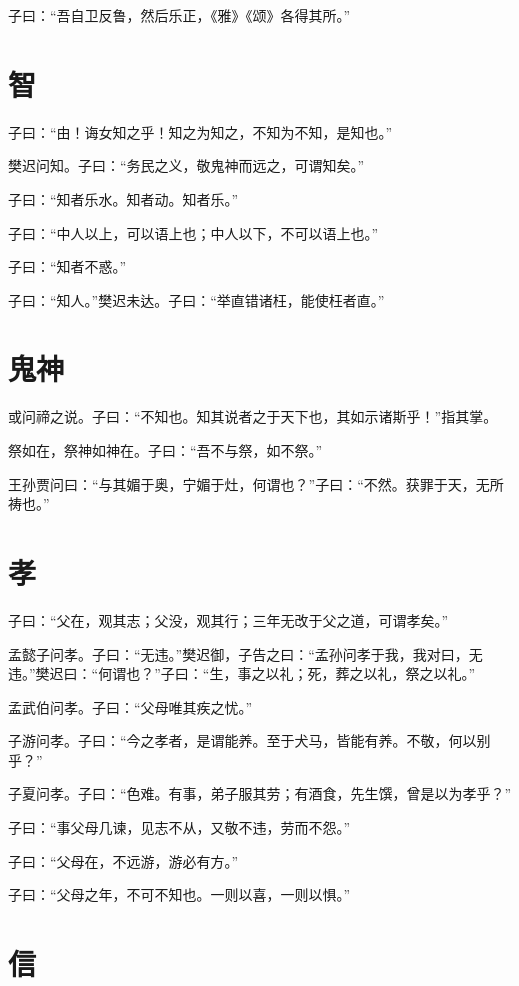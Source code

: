 \documentclass[a5paper]{ctexbook}
\begin{document}
    子曰：“吾自卫反鲁，然后乐正，《雅》《颂》各得其所。”

    \chapter{智}

    子曰：“由！诲女知之乎！知之为知之，不知为不知，是知也。”

    樊迟问知。子曰：“务民之义，敬鬼神而远之，可谓知矣。”
    
    子曰：“知者乐水。知者动。知者乐。”

    子曰：“中人以上，可以语上也；中人以下，不可以语上也。”

    子曰：“知者不惑。”

    子曰：“知人。”樊迟未达。子曰：“举直错诸枉，能使枉者直。”

    \chapter{鬼神}

    或问禘之说。子曰：“不知也。知其说者之于天下也，其如示诸斯乎！”指其掌。

    祭如在，祭神如神在。子曰：“吾不与祭，如不祭。”

    王孙贾问曰：“与其媚于奥，宁媚于灶，何谓也？”子曰：“不然。获罪于天，无所祷也。”

    \chapter{孝}

    子曰：“父在，观其志；父没，观其行；三年无改于父之道，可谓孝矣。”

    孟懿子问孝。子曰：“无违。”樊迟御，子告之曰：“孟孙问孝于我，我对曰，无违。”樊迟曰：“何谓也？”子曰：“生，事之以礼；死，葬之以礼，祭之以礼。”

    孟武伯问孝。子曰：“父母唯其疾之忧。”

    子游问孝。子曰：“今之孝者，是谓能养。至于犬马，皆能有养。不敬，何以别乎？”

    子夏问孝。子曰：“色难。有事，弟子服其劳；有酒食，先生馔，曾是以为孝乎？”

    子曰：“事父母几谏，见志不从，又敬不违，劳而不怨。”

    子曰：“父母在，不远游，游必有方。”

    子曰：“父母之年，不可不知也。一则以喜，一则以惧。”

    \chapter{信}
\end{document}
